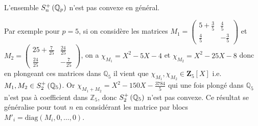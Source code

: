 \begin{remarque}
	L'ensemble $S_n^+\left( \mathbb{Q}_p \right) $ n'est pas convexe en général.

	Par exemple pour $p = 5$, si on considère les matrices $M_1 = \begin{pmatrix} 5 + \frac{3}{5} & \frac{4}{5} \\ \frac{4}{5} & -\frac{3}{5} \end{pmatrix} $ et $M_2 = \begin{pmatrix} 25+\frac{7}{25} & \frac{24}{25} \\ \frac{24}{25}&-\frac{7}{25} \end{pmatrix} $, on a $\chi_{M_1} = X^2 -5 X -4  $ et $\chi_{M_2} = X^2 - 25 X -8$ donc en plongeant ces matrices dans $\mathbb{Q}_5$ il vient que $\chi_{M_1}, \chi_{M_2} \in \mathbf{Z}_5[X]$ i.e. $M_1,M_2 \in S_2^+\left( \mathbb{Q}_5 \right) $. Or $\chi_{M_1 + M_2}  = X^{2} - 150 X - \frac{3784}{5}$ qui une fois plongé dans $\mathbb{Q}_5$ n'est pas à coefficient dans $\mathbb{Z}_5$, donc $ S_2^+\left( \mathbb{Q}_5 \right) $ n'est pas convexe. Ce résultat se généralise pour tout $n$ en considérant les matrice par blocs $M'_i = \text{diag}\left( M_{i},0,\ldots,0 \right) $.

\end{remarque}
